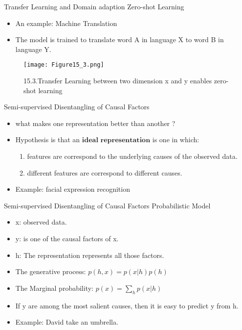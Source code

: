 \begin{frame}{Transfer Learning and Domain adaption}
Zero-shot Learning
\begin{itemize}
   \item An example: Machine Translation
   \item The model is trained to translate word A in language X to word B in language Y.
\end{itemize}
\begin{figure}[t]
\centering
\texttt{[image: Figure15\_3.png]} %
\caption{15.3.Transfer Learning between two dimension x and y enables zero-shot learning}
\end{figure}
\end{frame}

\begin{frame}{Semi-supervised Disentangling of Causal Factors}
\begin{itemize}
  \item what makes one representation better than another ?
  \item Hypothesis is that an $\bm{ideal}$ $\bm{representation}$ is one in which:
   \begin{enumerate} %
   \item features are correspond to the underlying causes of the observed data.
   \item different features are correspond to different causes.
   \end{enumerate}
  \item Example: facial expression recognition
\end{itemize}
\end{frame}

\begin{frame}{Semi-supervised Disentangling of Causal Factors}
Probabilistic Model
\begin{itemize}
  \item x: observed data.
  \item y: is one of the causal factors of x.
  \item h: The representation represents all those factors.
  \item The generative process: $ p(h,x) = p(x|h)p(h) $
  \item The Marginal probability: $ p(x) = \sum\limits_{h} p(x|h) $
  \item If y are among the most salient causes, then it is easy to predict y from h.
  \item Example: David take an umbrella.
\end{itemize}
\end{frame}

